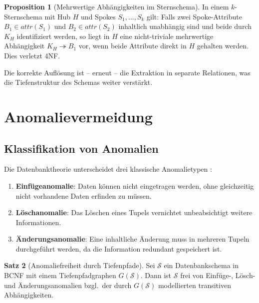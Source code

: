 ﻿\documentclass[a4paper,12pt]{report}
\theoremstyle{definition}
\newtheorem{theorem}{Satz}[chapter]
\newtheorem{proposition}[theorem]{Proposition}
\theoremstyle{remark}
\newcommand{\att}{\mathit{attr}}
\begin{document}
\begin{proposition}[Mehrwertige Abhängigkeiten im Sternschema]
\label{prop:mvd_stern}
In einem $k$-Sternschema mit Hub $H$ und Spokes $S_1, \ldots, S_k$ gilt:
Falls zwei Spoke-Attribute $B_1 \in \att(S_1)$ und $B_2 \in \att(S_2)$
inhaltlich unabhängig sind und beide durch $K_H$ identifiziert werden, so
liegt in $H$ eine nicht-triviale mehrwertige Abhängigkeit $K_H \twoheadrightarrow B_1$
vor, wenn beide Attribute direkt in $H$ gehalten werden. Dies verletzt 4NF.
\end{proposition}

Die korrekte Auflösung ist -- erneut -- die Extraktion in separate Relationen,
was die Tiefenstruktur des Schemas weiter verstärkt.

\section{Anomalievermeidung}
\label{sec:anomalien}

\subsection{Klassifikation von Anomalien}

Die Datenbanktheorie unterscheidet drei klassische Anomalietypen \cite{Date2003}:

\begin{enumerate}[label=(\roman*)]
  \item \textbf{Einfügeanomalie}: Daten können nicht eingetragen werden,
        ohne gleichzeitig nicht vorhandene Daten erfinden zu müssen.
  \item \textbf{Löschanomalie}: Das Löschen eines Tupels vernichtet
        unbeabsichtigt weitere Informationen.
  \item \textbf{Änderungsanomalie}: Eine inhaltliche Änderung muss in
        mehreren Tupeln durchgeführt werden, da die Information redundant gespeichert ist.
\end{enumerate}

\begin{theorem}[Anomaliefreiheit durch Tiefenpfade]
\label{thm:anomaliefrei}
Sei $\mathcal{S}$ ein Datenbankschema in BCNF mit einem Tiefenpfadgraphen
$G(\mathcal{S})$. Dann ist $\mathcal{S}$ frei von Einfüge-, Lösch- und
Änderungsanomalien bzgl.\ der durch $G(\mathcal{S})$ modellierten
transitiven Abhängigkeiten.
\end{theorem}
\end{document}
